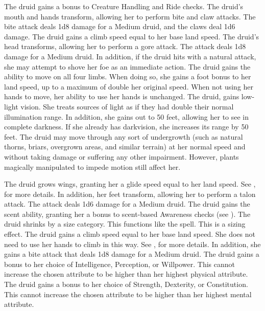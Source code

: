    The druid gains a  bonus to Creature Handling and Ride checks.
    The druid's mouth and hands transform, allowing her to perform bite and claw attacks.
    The bite attack deals 1d8 damage for a Medium druid, and the claws deal 1d6 damage.
    The druid gains a climb speed equal to her base land speed.
    The druid's head transforms, allowing her to perform a gore attack.
    The attack deals 1d8 damage for a Medium druid.
    In addition, if the druid hits with a natural attack, she may attempt to shove her foe as an immediate action.
    The druid gains the ability to move on all four limbs.
    When doing so, she gains a  foot bonus to her land speed, up to a maximum of double her original speed.
    When not using her hands to move, her ability to use her hands is unchanged.
    The druid, gains low-light vision.
    She treats sources of light as if they had double their normal illumination range.
    In addition, she gains  out to 50 feet, allowing her to see in complete darkness.
    If she already has darkvision, she increases its range by 50 feet.
    The druid may move through any sort of undergrowth (such as natural thorns, briars, overgrown areas, and similar terrain) at her normal speed and without taking damage or suffering any other impairment.
    However, plants magically manipulated to impede motion still affect her.

    The druid grows wings, granting her a glide speed equal to her land speed.
    See , for more details.
    In addition, her feet transform, allowing her to perform a talon attack.
    The attack deals 1d6 damage for a Medium druid.
    The druid gains the scent ability, granting her a  bonus to scent-based Awareness checks (see ).
    The druid shrinks by a size category.
    This functions like the  spell.
    This is a sizing effect.
    The druid gains a climb speed equal to her base land speed.
    She does not need to use her hands to climb in this way.
    See , for more details.
    In addition, she gains a bite attack that deals 1d8 damage for a Medium druid.
    The druid gains a  bonus to her choice of Intelligence, Perception, or Willpower.
    This cannot increase the chosen attribute to be higher than her highest physical attribute.
    The druid gains a  bonus to her choice of Strength, Dexterity, or Constitution.
    This cannot increase the chosen attribute to be higher than her highest mental attribute.

